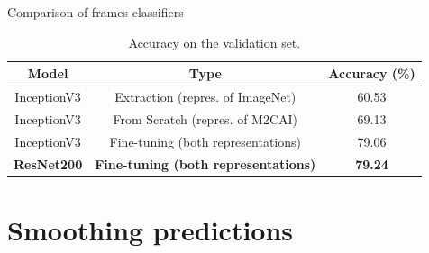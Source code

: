 \begin{frame}{Comparison of frames classifiers}
	
	\begin{table}
	\begin{center}
		\begin{tabular}{|c|c|c|}
			\hline
			Model & Type & Accuracy (\%) \\
			\hline\hline
			InceptionV3 & Extraction (repres. of ImageNet)& 60.53 \\
			InceptionV3 & From Scratch (repres. of M2CAI) & 69.13 \\
			InceptionV3 & Fine-tuning (both representations) & 79.06 \\
			\textbf{ResNet200} & \textbf{Fine-tuning (both representations)} & \textbf{79.24} \\
			\hline
		\end{tabular}
	\end{center}
	\caption{Accuracy on the validation set.}
	\end{table}

\end{frame}


\section{Smoothing predictions} \subsection{}\label{}

